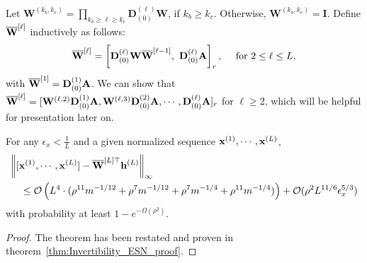 Let $\mathbf{W}^{(k_{b}, k_{e})} = \prod_{k_{b} \ge \ell \ge k_{e}} \mathbf{D}_{(0)}^{(\ell)} \mathbf{W}$, if $k_b \ge k_c$. Otherwise, $\mathbf{W}^{(k_{b}, k_{e})} = \mathbf{I}$. 
Define $\overline{\mathbf{W}}^{[\ell]}$ inductively as follows:
\begin{equation*}
	\overline{\mathbf{W}}^{[\ell]} = \left[\mathbf{D}^{(\ell)}_{(0)} \mathbf{W} \overline{\mathbf{W}}^{[\ell-1]},\text{ } \mathbf{D}_{(0)}^{(\ell)}\mathbf{A}\right]_r, \quad \text{ for } 2 \le \ell \le L,
\end{equation*}
with $\overline{\mathbf{W}}^{[1]} = \mathbf{D}^{(1)}_{(0)} \mathbf{A}$.  We can show that $\overline{\mathbf{W}}^{[\ell]} = [\mathbf{W}^{(\ell, 2)} \mathbf{D}_{(0)}^{(1)} \mathbf{A}, \mathbf{W}^{(\ell, 3)} \mathbf{D}_{(0)}^{(2)} \mathbf{A}, \cdots, \mathbf{D}_{(0)}^{(\ell)} \mathbf{A}]_r$ for $\ell \ge 2$, which will be helpful for presentation later on.
\begin{theorem}\label{thm:Invertibility_ESN}
	For any $\epsilon_x < \frac{1}{L}$ and a given normalized sequence $\mathbf{x}^{(1)}, \cdots, \mathbf{x}^{(L)}$, 
	\begin{align*}
		&\norm{[\mathbf{x}^{(1)}, \cdots, \mathbf{x}^{(L)}] - \overline{\mathbf{W}}^{[L]\top} \mathbf{h}^{(L)}}_\infty \\&\quad \leq \mathcal{O}\left(L^4 \cdot (\rho^{11} m^{-1/12} + \rho^{7} m^{-1/12} + \rho^{7} m^{-1/4} + \rho^{11} m^{-1/4})  \right) + \mathcal{O}(\rho^2 L^{11/6} \epsilon_x^{5/3})
	\end{align*}
	with probability at least $1 - e^{-\Omega(\rho^2)}$. 
\end{theorem}
\begin{proof}
	The theorem has been restated and proven in theorem~\ref{thm:Invertibility_ESN_proof}.
\end{proof}


